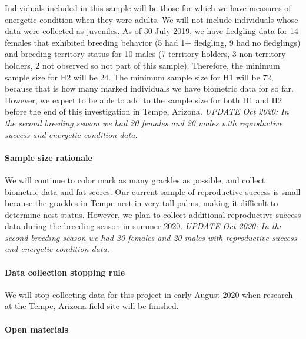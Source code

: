 \documentclass[
]{article}
\begin{document}
Individuals included in this sample will be those for which we have
measures of energetic condition when they were adults. We will not
include individuals whose data were collected as juveniles. As of 30
July 2019, we have fledgling data for 14 females that exhibited breeding
behavior (5 had 1+ fledgling, 9 had no fledglings) and breeding
territory status for 10 males (7 territory holders, 3 non-territory
holders, 2 not observed so not part of this sample). Therefore, the
minimum sample size for H2 will be 24. The minimum sample size for H1
will be 72, because that is how many marked individuals we have
biometric data for so far. However, we expect to be able to add to the
sample size for both H1 and H2 before the end of this investigation in
Tempe, Arizona. \emph{UPDATE Oct 2020: In the second breeding season we
had 20 females and 20 males with reproductive success and energetic
condition data.}

\hypertarget{sample-size-rationale}{%
\paragraph{\texorpdfstring{\textbf{Sample size
rationale}}{Sample size rationale}}\label{sample-size-rationale}}

We will continue to color mark as many grackles as possible, and collect
biometric data and fat scores. Our current sample of reproductive
success is small because the grackles in Tempe nest in very tall palms,
making it difficult to determine nest status. However, we plan to
collect additional reproductive success data during the breeding season
in summer 2020. \emph{UPDATE Oct 2020: In the second breeding season we
had 20 females and 20 males with reproductive success and energetic
condition data.}

\hypertarget{data-collection-stopping-rule}{%
\paragraph{\texorpdfstring{\textbf{Data collection stopping
rule}}{Data collection stopping rule}}\label{data-collection-stopping-rule}}

We will stop collecting data for this project in early August 2020 when
research at the Tempe, Arizona field site will be finished.

\hypertarget{open-materials}{%
\paragraph{\texorpdfstring{\textbf{Open
materials}}{Open materials}}\label{open-materials}}
\end{document}
